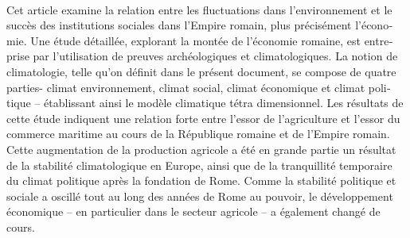 \begin{myabstract}
	\hspace{2em}\\\noindent%
	\foreignlanguage{french}{Cet article examine la relation entre les fluctuations dans l'environnement et le succès des institutions sociales dans l'Empire romain, plus précisément l'économie. Une étude détaillée, explorant la montée de l'économie romaine, est entreprise par l'utilisation de preuves archéologiques et climatologiques. La notion de climatologie, telle qu’on définit dans le présent document, se compose de quatre parties- climat environnement, climat social, climat économique et climat politique – établissant ainsi le modèle climatique tétra dimensionnel. Les résultats de cette étude indiquent une relation forte entre l'essor de l'agriculture et l'essor du commerce maritime au cours de la République romaine et de l'Empire romain. Cette augmentation de la production agricole a été en grande partie un résultat de la stabilité climatologique en Europe, ainsi que de la tranquillité temporaire du climat politique après la fondation de Rome. Comme la stabilité politique et sociale a oscillé tout au long des années de Rome au pouvoir, le développement économique – en particulier dans le secteur agricole – a également changé de cours.}

\end{myabstract}
	



	\printbibliography[heading=subbibnumbered] 

	\label{davis:lastpage}
\closingarticle

